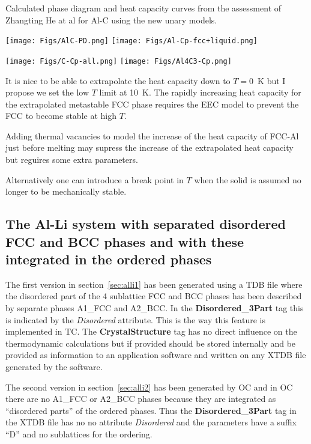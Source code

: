 \documentclass{article}
\begin{document}
\begin{appendices}
\newpage

Calculated phase diagram and heat capacity curves from the assessment
of Zhangting He at al for Al-C using the new unary models.

\texttt{[image: Figs/AlC-PD.png]}
\texttt{[image: Figs/Al-Cp-fcc+liquid.png]}

\texttt{[image: Figs/C-Cp-all.png]}
\texttt{[image: Figs/Al4C3-Cp.png]}

It is nice to be able to extrapolate the heat capacity down to $T=0$~K
but I propose we set the low $T$ limit at 10~K.  The rapidly
increasing heat capacity for the extrapolated metastable FCC phase
requires the EEC model to prevent the FCC to become stable at high $T$.

Adding thermal vacancies to model the increase of the heat capacity of
FCC-Al just before melting may supress the increase of the
extrapolated heat capacity but reguires some extra parameters.

Alternatively one can introduce a break point in $T$ when the solid is
assumed no longer to be mechanically stable.

\newpage

\subsection{The Al-Li system with separated disordered FCC and BCC phases
  and with these integrated in the ordered phases}

The first version in section~\ref{sec:alli1} has been generated using
a TDB file where the disordered part of the 4 sublattice FCC and BCC
phases has been described by separate phases A1\_FCC and A2\_BCC.  In
the {\bf Disordered\_3Part} tag this is indicated by the {\em Disordered}
attribute.  This is the way this feature is implemented in TC.  The
{\bf CrystalStructure} tag has no direct influence on the
thermodynamic calculations but if provided should be stored internally
and be provided as information to an application software and written
on any XTDB file generated by the software.

The second version in section~\ref{sec:alli2} has been generated by OC
and in OC there are no A1\_FCC or A2\_BCC phases because they are
integrated as ``disordered parts'' of the ordered phases.  Thus the
{\bf Disordered\_3Part} tag in the XTDB file has no no attribute {\em
  Disordered} and the parameters have a suffix ``D'' and no
sublattices for the ordering.


\end{appendices}
\end{document}
